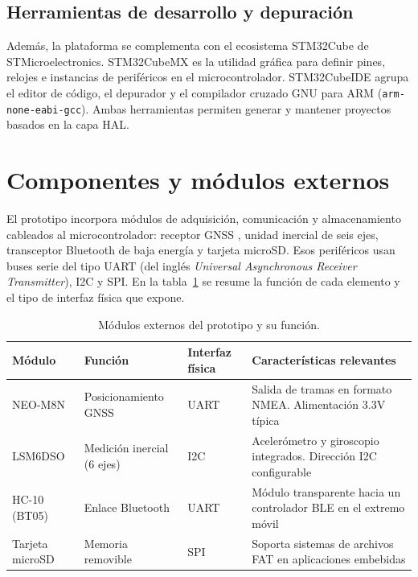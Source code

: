 \subsection{Herramientas de desarrollo y depuración}

Además, la plataforma se complementa con el ecosistema STM32Cube de STMicroelectronics. STM32CubeMX es la utilidad gráfica para definir pines, relojes e instancias de periféricos en el microcontrolador. STM32CubeIDE \citep{st_stm32cubeide} agrupa el editor de código, el depurador y el compilador cruzado GNU para ARM (\texttt{arm-none-eabi-gcc}). Ambas herramientas permiten generar y mantener proyectos basados en la capa HAL.

\section{Componentes y módulos externos}
\label{sec:componentes-externos}

El prototipo incorpora módulos de adquisición, comunicación y almacenamiento cableados al microcontrolador: receptor GNSS \citep{gnss_overview}, unidad inercial de seis ejes, transceptor Bluetooth de baja energía y tarjeta microSD. Esos periféricos usan buses serie del tipo UART (del inglés \textit{Universal Asynchronous Receiver Transmitter}), I2C y SPI. En la tabla~\ref{tab:componentes-externos} se resume la función de cada elemento y el tipo de interfaz física que expone.

\begin{table}[H]
	\centering
	\caption[Módulos del prototipo]{Módulos externos del prototipo y su función.}
	\setlength{\tabcolsep}{4pt}
	\begin{tabularx}{\textwidth}{@{}>{\raggedright\arraybackslash}p{2.2cm}>{\raggedright\arraybackslash}p{3.2cm}>{\raggedright\arraybackslash}p{2.8cm}>{\raggedright\arraybackslash}X@{}}
		\toprule
		\textbf{Módulo} & \textbf{Función} & \textbf{Interfaz física} & \textbf{Características relevantes} \\
		\midrule
		NEO-M8N & Posicionamiento GNSS & UART & Salida de tramas en formato NMEA. Alimentación 3.3V típica \citep{ublox_neo_m8n} \\
		LSM6DSO & Medición inercial (6 ejes) & I2C & Acelerómetro y giroscopio integrados. Dirección I2C configurable \citep{st_lsm6dso} \\
		HC-10 (BT05) & Enlace Bluetooth & UART & Módulo transparente hacia un controlador BLE en el extremo móvil \citep{hc10_bt05} \\
		Tarjeta microSD & Memoria removible & SPI & Soporta sistemas de archivos FAT en aplicaciones embebidas \\
		\bottomrule
	\end{tabularx}
	\label{tab:componentes-externos}
\end{table}

